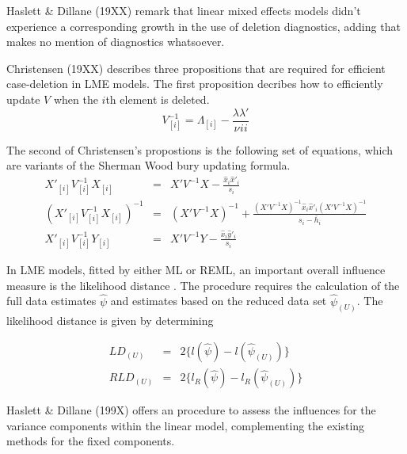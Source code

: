 \documentclass[12pt, a4paper]{article}
\begin{document}
	
	Haslett \& Dillane (19XX) remark that linear mixed effects models
	didn't experience a corresponding growth in the use of deletion
	diagnostics, adding that \citet{McCullSearle} makes no mention of
	diagnostics whatsoever.
	
	
	Christensen (19XX)  describes three propositions that are required
	for efficient case-deletion in LME models. The first proposition
	decribes how to efficiently update $V$ when the $i$th element is
	deleted.
	\begin{equation}
	V_{[i]}^{-1} = \Lambda_{[i]} - \frac{\lambda
		\lambda\prime}{\nu^{}ii}
	\end{equation}
	
	
	The second of Christensen's propostions is the following set of
	equations, which are variants of the Sherman Wood bury updating
	formula.
	\begin{eqnarray}
	X'_{[i]}V_{[i]}^{-1}X_{[i]} &=& X' V^{-1}X -
	\frac{\hat{x}_{i}\hat{x}'_{i}}{s_{i}}\\
	(X'_{[i]}V_{[i]}^{-1}X_{[i]})^{-1} &=& (X' V^{-1}X)^{-1} +
	\frac{(X' V^{-1}X)^{-1}\hat{x}_{i}\hat{x}' _{i}
		(X' V^{-1}X)^{-1}}{s_{i}- \bar{h}_{i}}\\
	X'_{[i]}V_{[i]}^{-1}Y_{[i]} &=& X\prime V^{-1}Y -
	\frac{\hat{x}_{i}\hat{y}' _{i}}{s_{i}}
	\end{eqnarray}
	
	
	
	
	
	
	
	
	In LME models, fitted by either ML or REML, an important overall
	influence measure is the likelihood distance \citep{cook82}. The
	procedure requires the calculation of the full data estimates
	$\hat{\psi}$ and estimates based on the reduced data set
	$\hat{\psi}_{(U)}$. The likelihood distance is given by
	determining
	
	
	\begin{eqnarray}
	LD_{(U)} &=& 2\{l(\hat{\psi}) - l( \hat{\psi}_{(U)}) \}\\
	RLD_{(U)} &=& 2\{l_{R}(\hat{\psi}) - l_{R}(\hat{\psi}_{(U)})\}
	\end{eqnarray}
	
	
	Haslett \& Dillane (199X) offers an
	procedure to assess the influences for the variance components
	within the linear model, complementing the existing methods for
	the fixed components. 
	
\end{document}
